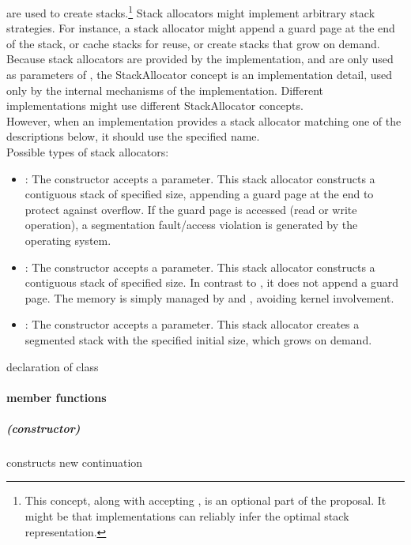 \label{subsec:stackalloc}
are used to create stacks.\footnote{This concept, along with \call accepting
, is an optional part of the proposal. It might be
that implementations can reliably infer the optimal stack representation.}
Stack allocators might implement arbitrary stack strategies. For instance, a
stack allocator might append a guard page at the end of the stack, or cache
stacks for reuse, or create stacks that grow on demand.\\
Because stack allocators are provided by the implementation, and are only used
as parameters of \call, the StackAllocator concept is an implementation detail,
used only by the internal mechanisms of the \cc implementation. Different
implementations might use different StackAllocator concepts.\\
However, when an implementation provides a stack allocator matching one of
the descriptions below, it should use the specified name.\\
Possible types of stack allocators:
\begin{itemize}
    \item {}: The constructor accepts a 
        parameter. This stack allocator constructs a contiguous stack of
        specified size, appending a guard page at the end to protect against
        overflow. If the guard page is accessed (read or write operation), a
        segmentation fault/access violation is generated by the operating
        system.
    \item {}: The constructor accepts a  parameter.
        This stack allocator constructs a contiguous stack of specified size.
        In contrast to , it does not append a guard
        page. The memory is simply managed by 
        and , avoiding kernel involvement.
    \item {}: The constructor accepts a  parameter.
        This stack allocator creates a segmented stack with the specified
        initial size, which grows on demand.
\end{itemize}


declaration of class \cont
{}
\paragraph*{member functions}
\subparagraph*{(constructor)}
constructs new continuation\\

